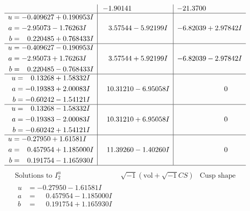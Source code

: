 \documentclass[1p]{elsarticle_modified}
\theoremstyle{definition}
\newcommand{\I}{\sqrt{-1}}
\begin{document}
$$\begin{array}{c|c|c}
 & -1.90141\phantom{ +0.000000I} & -21.3700\phantom{ +0.000000I} \\ \hline\begin{aligned}
u &= -0.409627 + 0.190953 I \\
a &= -2.95073 - 1.76263 I \\
b &= \phantom{-}0.220485 + 0.768433 I\end{aligned}
 & \phantom{-}3.57544 - 5.92199 I & -6.82039 + 2.97842 I \\ \hline\begin{aligned}
u &= -0.409627 - 0.190953 I \\
a &= -2.95073 + 1.76263 I \\
b &= \phantom{-}0.220485 - 0.768433 I\end{aligned}
 & \phantom{-}3.57544 + 5.92199 I & -6.82039 - 2.97842 I \\ \hline\begin{aligned}
u &= \phantom{-}0.13268 + 1.58332 I \\
a &= -0.19383 + 2.00083 I \\
b &= -0.60242 - 1.54121 I\end{aligned}
 & \phantom{-}10.31210 - 6.95058 I & \phantom{-0.000000 } 0 \\ \hline\begin{aligned}
u &= \phantom{-}0.13268 - 1.58332 I \\
a &= -0.19383 - 2.00083 I \\
b &= -0.60242 + 1.54121 I\end{aligned}
 & \phantom{-}10.31210 + 6.95058 I & \phantom{-0.000000 } 0 \\ \hline\begin{aligned}
u &= -0.27950 + 1.61581 I \\
a &= \phantom{-}0.457954 + 1.185000 I \\
b &= \phantom{-}0.191754 - 1.165930 I\end{aligned}
 & \phantom{-}11.39260 - 1.40260 I & \phantom{-0.000000 } 0\\
 \hline 
 \end{array}$$\newpage$$\begin{array}{c|c|c}  
\text{Solutions to }I^u_{2}& \I (\text{vol} + \sqrt{-1}CS) & \text{Cusp shape}\\
 \hline 
\begin{aligned}
u &= -0.27950 - 1.61581 I \\
a &= \phantom{-}0.457954 - 1.185000 I \\
b &= \phantom{-}0.191754 + 1.165930 I\end{aligned}

\end{array}$$
\end{document}
